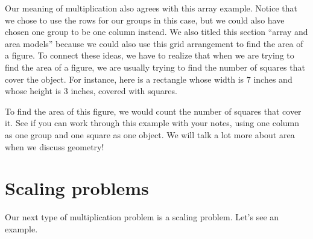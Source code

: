 \documentclass{ximera}
\begin{document}
Our meaning of multiplication also agrees with this array example. Notice that we chose to use the rows for our groups in this case, but we could also have chosen one group to be one column instead. We also titled this section ``array and area models'' because we could also use this grid arrangement to find the area of a figure. To connect these ideas, we have to realize that when we are trying to find the area of a figure, we are usually trying to find the number of squares that cover the object. For instance, here is a rectangle whose width is $7$ inches and whose height is $3$ inches, covered with squares.
\begin{image}
\end{image}
To find the area of this figure, we would count the number of squares that cover it. See if you can work through this example with your notes, using one column as one group and one square as one object. We will talk a lot more about area when we discuss geometry!





\section{Scaling problems}

Our next type of multiplication problem is a scaling problem. Let's see an example.
\end{document}
